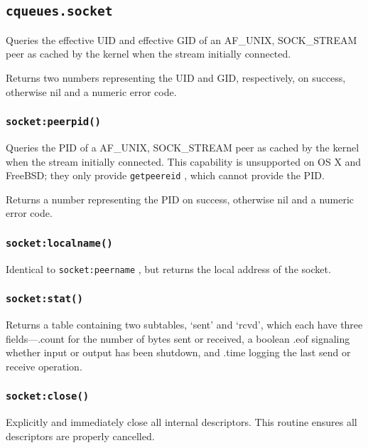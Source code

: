 \documentclass[11pt, oneside]{memoir}
\newcommand{\fn}[1]{\texttt{#1} }
\newcounter{toccols}
\newenvironment{Module}[1]{
	\subsection{\texttt{#1}}
	\addtocontents{toc}{
		\protect\begin{multicols}{\value{toccols}}
	}
}{
	\addtocontents{toc}{\protect\end{multicols}}
}
\begin{document}
\begin{Module}{cqueues.socket}
Queries the effective UID and effective GID of an AF\_UNIX, SOCK\_STREAM peer as cached by the kernel when the stream initially connected.

Returns two numbers representing the UID and GID, respectively, on success, otherwise nil and a numeric error code.

\subsubsection[\fn{socket:peerpid}]{\fn{socket:peerpid()}}

Queries the PID of a AF\_UNIX, SOCK\_STREAM peer as cached by the kernel when the stream initially connected. This capability is unsupported on OS X and FreeBSD; they only provide \fn{getpeereid}, which cannot provide the PID.

Returns a number representing the PID on success, otherwise nil and a numeric error code.

\subsubsection[\fn{socket:localname}]{\fn{socket:localname()}}

Identical to \fn{socket:peername}, but returns the local address of the socket.

\subsubsection[\fn{socket:stat}]{\fn{socket:stat()}}

Returns a table containing two subtables, `sent' and `rcvd', which each have three fields---.count for the number of bytes sent or received, a boolean .eof  signaling whether input or output has been shutdown, and .time logging the last send or receive operation.

\subsubsection[\fn{socket:close}]{\fn{socket:close()}}
Explicitly and immediately close all internal descriptors. This routine ensures all descriptors are properly cancelled.

\end{Module}
\end{document}
